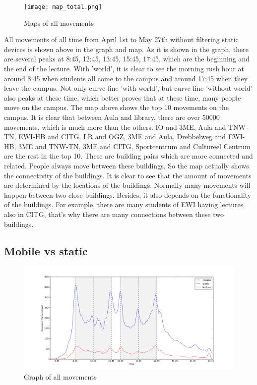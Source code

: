 \begin{figure}[H]
	\centering
	\texttt{[image: map\_total.png]}
	\captionsetup{justification=centering}
	\caption{Maps of all movements}
	\label{building_all_map}
\end{figure}
All movements of all time from April 1st to May 27th without filtering static devices is shown above in the graph and map. As it is shown in the graph, there are several peaks at 8:45, 12:45, 13:45, 15:45, 17:45, which are the beginning and the end of the lecture. With 'world', it is clear to see the morning rush hour at around 8:45 when students all come to the campus and around 17:45 when they leave the campus. Not only curve line 'with world', but curve line 'without world' also peaks at these time, which better proves that at these time, many people move on the campus.
The map above shows the top 10 movements on the campus. It is clear that between Aula and library, there are over 50000 movements, which is much more than the others. IO and 3ME, Aula and TNW-TN, EWI-HB and CITG, LR and OGZ, 3ME and Aula, Drebbelweg and EWI-HB, 3ME and TNW-TN, 3ME and CITG, Sportcentrum and Cultureel Centrum are the rest in the top 10. These are building pairs which are more connected and related. People always move between these buildings. So the map actually shows the connectivity of the buildings. It is clear to see that the amount of movements are determined by the locations of the buildings. Normally many movements will happen between two close buildings. Besides, it also depends on the functionality of the buildings. For example, there are many students of EWI having lectures also in CITG, that's why there are many connections between these two buildings.

\subsection{Mobile vs static}\label{chapter9mobilestatic}
\begin{figure}[H]
	\centering
	\includegraphics[scale=0.3]{building_mobileStatic_graph.png}
	\captionsetup{justification=centering}
	\caption{Graph of all movements}
	\label{building_mobileStatic_graph}
\end{figure}


